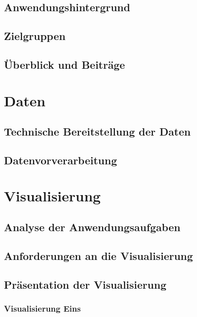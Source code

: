 \documentclass[paper=a4,12pt,titlepage,listof=totoc]{scrartcl}
\begin{document}
\subsection{Anwendungshintergrund}

\subsection{Zielgruppen}

\subsection{Überblick und Beiträge}
\newpage

\section{Daten}

\subsection{Technische Bereitstellung der Daten}

\subsection{Datenvorverarbeitung}
\newpage

\section{Visualisierung}

\subsection{Analyse der Anwendungsaufgaben}

\subsection{Anforderungen an die Visualisierung}

\subsection{Präsentation der Visualisierung}

\subsubsection{Visualisierung Eins}
\end{document}
